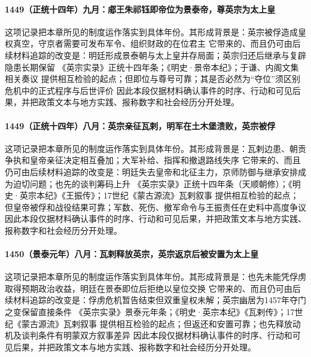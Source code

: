 \paragraph{1449（正统十四年）九月：郕王朱祁钰即帝位为景泰帝，尊英宗为太上皇} 这项记录把本章所见的制度运作落实到具体年份。其形成背景是：英宗被俘造成皇权真空，守京者需要可发布军令、组织财政的在位君主 它带来的、而且仍可由后续材料追踪的改变是：明廷形成景泰朝与太上皇并存局面；英宗归还后继承与复辟隐患长期保留 《英宗实录》正统十四年条；《明史·景帝本纪》；于谦、内阁文集相关奏议 提供相互检验的起点；但即位与尊号可靠；其是否必然为“夺位”须区别危机中的正式程序与后世评价 因此本段仅据材料确认事件的时序、行动和可见后果，并把政策文本与地方实践、报称数字和社会经历分开处理。

\paragraph{1449（正统十四年）八月：英宗亲征瓦剌，明军在土木堡溃败，英宗被俘} 这项记录把本章所见的制度运作落实到具体年份。其形成背景是：瓦剌边患、朝贡争执和皇帝亲征决定相互叠加；大军补给、指挥和撤退路线失序 它带来的、而且仍可由后续材料追踪的改变是：明廷失去皇帝和北征主力，京师防御与继承安排成为迫切问题；也先的谈判筹码上升 《英宗实录》正统十四年条（天顺朝修）；《明史·英宗本纪》《王振传》；17世纪《蒙古源流》瓦剌叙事 提供相互检验的起点；但皇帝被俘和战役结果可靠；军数、死伤、撤军命令与王振责任在史料中高度争议 因此本段仅据材料确认事件的时序、行动和可见后果，并把政策文本与地方实践、报称数字和社会经历分开处理。

\paragraph{1450（景泰元年）八月：瓦剌释放英宗，英宗返京后被安置为太上皇} 这项记录把本章所见的制度运作落实到具体年份。其形成背景是：也先未能凭俘虏取得预期政治收益，明廷在景泰即位后拒绝以皇位交换 它带来的、而且仍可由后续材料追踪的改变是：俘虏危机暂告结束但双重皇权未解；英宗幽居为1457年夺门之变保留直接条件 《英宗实录》景泰元年条；《明史·英宗本纪》《瓦剌传》；17世纪《蒙古源流》瓦剌叙事 提供相互检验的起点；但返还和安置可靠；也先释放动机及谈判条件有明蒙双方叙事差异 因此本段仅据材料确认事件的时序、行动和可见后果，并把政策文本与地方实践、报称数字和社会经历分开处理。
